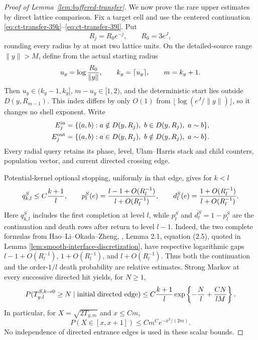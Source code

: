 \begin{proof}[Proof of Lemma~\ref{lem:buffered-transfer}]
We now prove the rare upper estimates by direct lattice comparison.  Fix a target cell
and use the centered continuation \eqref{eq:ct-transfer-39k}--\eqref{eq:ct-transfer-39l}.  Put
\[
R_j=R_0e^{-j},\qquad R_0=3e^J,
\]
rounding every radius by at most two lattice units.  On the detailed-source
range $\|y\|>M$, define from the actual starting radius
\begin{equation}
u_y=\log {R_0\over\|y\|},\qquad
 k_y=\lceil u_y\rceil,\qquad m=k_y+1.\label{eq:ct-transfer-45a0}
\end{equation}
Then $u_y\in(k_y-1,k_y]$, $m-u_y\in[1,2)$, and the
deterministic start lies outside $D(y,R_{m-1})$.  This index differs by
only $O(1)$ from $\lfloor\log(e^J/\|y\|)\rfloor$, so it changes no
shell exponent.  Write
\begin{equation}
\begin{split}
 E_j^{\rm in}&=\{(a,b):a\notin D(y,R_j),\ b\in D(y,R_j),\ a\sim b\},\\
 E_j^{\rm out}&=\{(a,b):a\in D(y,R_j),\ b\notin D(y,R_j),\ a\sim b\}.
\end{split}\label{eq:ct-transfer-45a1}
\end{equation}
Every radial query retains its phase, level, Ulam--Harris stack and child
counters, population vector, and current directed crossing edge.

Potential-kernel optional stopping, uniformly in that edge, gives for
$k<l$
\begin{equation}
q^S_{k,l}\le C{k+1\over l},\qquad
 p_l^S(e)={l-1+O(R_l^{-1})\over l+O(R_l^{-1})},\qquad
 d_l^S(e)={1+O(R_l^{-1})\over l+O(R_l^{-1})}.\label{eq:ct-transfer-45a}
\end{equation}
Here $q^S_{k,l}$ includes the first completion at level $l$, while
$p_l^S$ and $d_l^S=1-p_l^S$ are the continuation and death rows
after return to level $l-1$.  Indeed, the two complete formulas from
Hao--Li--Okada--Zheng, \cite{HLOZ2025}, Lemma 2.1, equation (2.5), quoted in
Lemma \ref{lem:smooth-interface-discretization}, have respective logarithmic
gaps $l-1+O(R_l^{-1})$, $1+O(R_l^{-1})$, and
$l+O(R_l^{-1})$.  Thus both the continuation and the order-$1/l$
death probability are relative estimates.  Strong Markov at every
successive directed hit yields, for $N\ge1$,
\begin{equation}
P(T_{y,l}^{S,k\to0}\ge N\mid\hbox{initial directed edge})
 \le C{k+1\over l}\exp\left\{-{N\over l}+{CN\over lM}\right\}.\label{eq:ct-transfer-45b}
\end{equation}
In particular, for $X=\sqrt{2T_{y,m}}$ and $x\le Cm$,
\begin{equation}
P(X\in[x,x+1])
       \le Cm^C e^{-x^2/(2m)}.\label{eq:ct-transfer-45c}
\end{equation}
No independence of directed entrance edges is used in these scalar bounds.


\end{proof}
